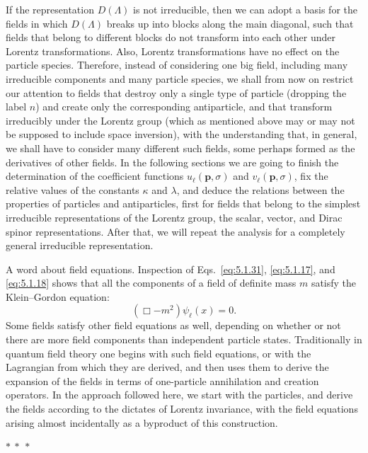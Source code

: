 If the representation $D(\Lambda)$ is not irreducible, then we can adopt a
basis for the fields in which $D(\Lambda)$ breaks up into blocks along the main
diagonal, such that fields that belong to different blocks do not transform
into each other under Lorentz transformations. Also, Lorentz transformations
have no effect on the particle species. Therefore, instead of considering one
big field, including many irreducible components and many particle species,
we shall from now on restrict our attention to fields that destroy only a
single type of particle (dropping the label $n$) and create only the
corresponding antiparticle, and that transform irreducibly under the Lorentz
group (which as mentioned above may or may not be supposed to include space
inversion), with the understanding that, in general, we shall have to consider
many different such fields, some perhaps formed as the derivatives of other
fields. In the following sections we are going to finish the determination of
the coefficient functions $u_\ell(\mathbf{p},\sigma)$ and
$v_\ell(\mathbf{p},\sigma)$, fix the relative values of the constants $\kappa$
and $\lambda$, and deduce the relations between the properties of particles
and antiparticles, first for fields that belong to the simplest irreducible
representations of the Lorentz group, the scalar, vector, and Dirac spinor
representations. After that, we will repeat the analysis for a completely
general irreducible representation.

A word about field equations. Inspection of Eqs.~\eqref{eq:5.1.31}, \eqref{eq:5.1.17}, and
\eqref{eq:5.1.18} shows that all the components of a field of definite mass $m$ satisfy
the Klein--Gordon equation:
\begin{equation}
  (\Box-m^2)\psi_\ell(x)=0.
  \tag{5.1.34}\label{eq:5.1.34}
\end{equation}
Some fields satisfy other field equations as well, depending on whether or not
there are more field components than independent particle states.
Traditionally in quantum field theory one begins with such field equations,
or with the Lagrangian from which they are derived, and then uses them to
derive the expansion of the fields in terms of one-particle annihilation and
creation operators. In the approach followed here, we start with the particles,
and derive the fields according to the dictates of Lorentz invariance, with the
field equations arising almost incidentally as a byproduct of this construction.

\begin{center}
$*\ *\ *$
\end{center}


